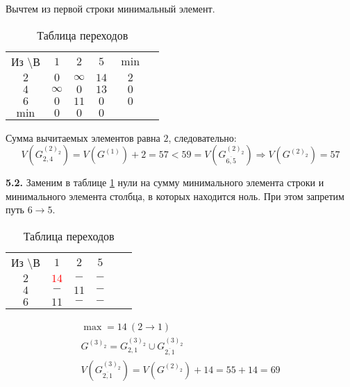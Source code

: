 Вычтем из первой строки минимальный элемент.

\begin{table}[H]
\begin{center}
	\def\tabcolsep{15pt}
	\caption{Таблица переходов}
	\label{tab:16}
	\begin{tabular}{|c||c|c|c|c|c|}
		\hline
		Из \textbackslash В & $1$ & $2$& $5$ & $\min$ \\
		\hhline{|=#=|=|=|=|}
		$2$ & $0$ & $\infty$ & $14$ & $2$ \\
		\hline
		$4$ & $\infty$ & $0$ & $13$ & $0$ \\
		\hline
		$6$ & $0$ & $11$ & $0$ & $0$ \\
		\hhline{|=#=|=|=|=|}
		$\min$ & $0$ & $0$ & $0$ & \\ 
		\hline
	\end{tabular}
\end{center}
\end{table}

Сумма вычитаемых элементов равна $2$, следовательно:
\begin{equation*}
V(G_{2,4}^{(2)_2}) = V(G^{(1)}) + 2 = 57 < 59 = V(G_{\overline{6,5}}^{(2)_2}) \Rightarrow V(G^{(2)_2}) = 57
\end{equation*}

\textbf{5.2.} Заменим в таблице \ref{tab:16} нули на сумму минимального элемента строки и минимального элемента столбца, в которых находится ноль. При этом запретим путь $6 \rightarrow 5$.

\begin{table}[H]
\begin{center}
	\def\tabcolsep{15pt}
	\caption{Таблица переходов}
	\label{tab:17}
	\begin{tabular}{|c||c|c|c|c|c|}
		\hline
		Из \textbackslash В & $1$ & $2$& $5$ \\
		\hhline{|=#=|=|=|=|}
		$2$ & \textcolor{red}{\boldmath$14$} & $-$ & $-$ \\
		\hline
		$4$ & $-$ & $11$ & $-$ \\
		\hline
		$6$ & $11$ & $-$ & $-$ \\
		\hline
	\end{tabular}
\end{center}
\end{table}

\begin{gather*}
\max = 14\ (2 \rightarrow 1) \\
G^{(3)_2} = G_{2,1}^{(3)_2} \cup G_{\overline{2,1}}^{(3)_2} \\
V(G_{\overline{2,1}}^{(3)_2}) = V(G^{(2)_2}) + 14 = 55 + 14 = 69
\end{gather*}


